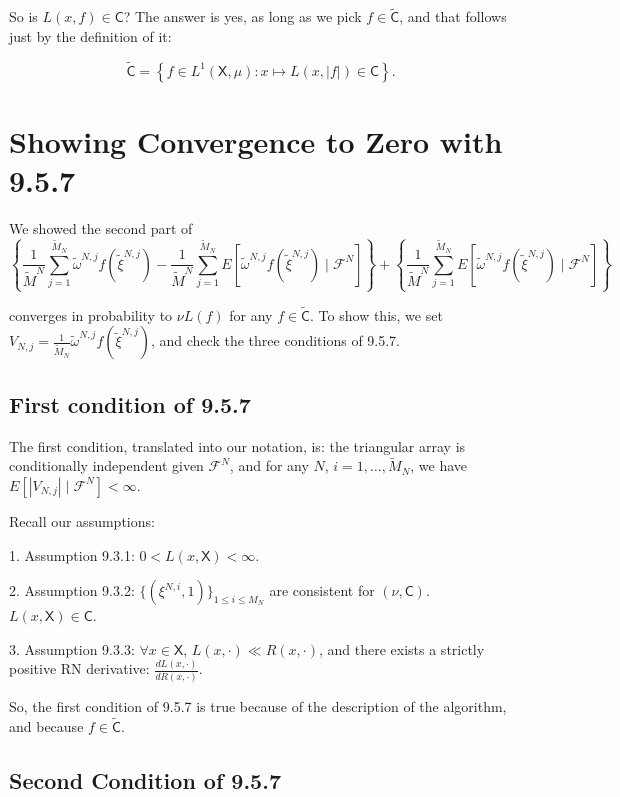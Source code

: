 \documentclass{article}
\begin{document}
So is $L(x, f) \in \mathsf{C}$? The answer is yes, as long as we pick $f \in \tilde{\mathsf{C}}$, and that follows just by the definition of it:

$$
\tilde{\mathsf{C}} = \left\{ f \in L^1(\mathsf{X}, \mu) : x \mapsto L(x, |f|) \in \mathsf{C}  \right\}.
$$

\section{Showing Convergence to Zero with 9.5.7}

We showed the second part of
$$  
\left\{
\frac{1}{\tilde{M}^N} \sum_{j=1}^{\tilde{M}_N} \tilde{\omega}^{N,j} f(\tilde{\xi}^{N,j}) 
- \frac{1}{\tilde{M}^N} \sum_{j=1}^{\tilde{M}_N} E\left[ \tilde{\omega}^{N,j} f(\tilde{\xi}^{N,j}) \mid \mathcal{F}^N \right]  \right\}
+ \left\{ \frac{1}{\tilde{M}^N} \sum_{j=1}^{\tilde{M}_N} E\left[ \tilde{\omega}^{N,j} f(\tilde{\xi}^{N,j}) \mid \mathcal{F}^N \right]  \right\}
$$

converges in probability to $\nu L(f)$ for any $f \in \tilde{\mathsf{C}}$. To show this, we set $V_{N,j} = \frac{1}{\tilde{M}_{N}} \tilde{\omega}^{N,j} f(\tilde{\xi}^{N,j})$, and check the three conditions of 9.5.7. 

\subsection{First condition of 9.5.7}

The first condition, translated into our notation, is: the triangular array is conditionally independent given $\mathcal{F}^N$, and for any $N$, $i=1,\ldots, \tilde{M}_N$, we have $E[|V_{N,j}| \mid \mathcal{F}^N] < \infty$. 

Recall our assumptions:

1. Assumption 9.3.1: $0 < L(x,\mathsf{X}) < \infty$.

2. Assumption 9.3.2: $\{(\xi^{N,i},1)\}_{1 \le i \le M_N}$ are consistent for $(\nu, \mathsf{C})$. $L(x,\mathsf{X}) \in \mathsf{C}$.

3. Assumption 9.3.3: $\forall x \in \mathsf{X}$, $L(x, \cdot) \ll R(x, \cdot)$, and there exists a strictly positive RN derivative: $\frac{dL(x,\cdot )}{dR(x, \cdot)}$.

So, the first condition of 9.5.7 is true because of the description of the algorithm, and because $f \in \tilde{\mathsf{C}}$.

\subsection{Second Condition of 9.5.7}
\end{document}
